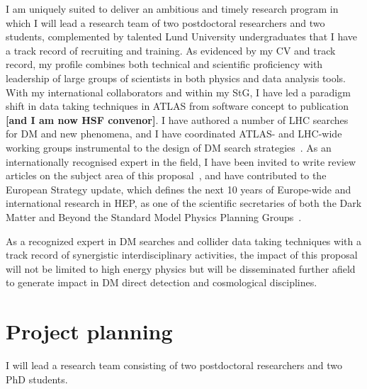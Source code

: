 \documentclass[11pt,a4paper]{article}
\begin{document}
I am uniquely suited to deliver an ambitious and timely research program in which I will lead a research team of two postdoctoral researchers and two students, complemented by talented Lund University undergraduates that I have a track record of recruiting and training.
As evidenced by my CV and track record, my profile combines both technical and scientific proficiency with leadership of large groups of scientists in both physics and data analysis tools. 
With my international collaborators and within my StG, I have led a paradigm shift in data taking techniques in ATLAS from software concept to publication \textbf{[and I am now HSF convenor]}. I have authored a number of LHC searches for DM and new phenomena, and I have coordinated ATLAS- and LHC-wide working groups instrumental to the design of DM search strategies~\cite{DMWG}. 
As an internationally recognised expert in the field, I have been invited to write review articles on the subject area of this proposal~\cite{Buchmueller:2017qhf, Boveia:2018yeb}, and have contributed to the European Strategy update, which defines the next 10 years of Europe-wide and international research in HEP, as one of the scientific secretaries of both the Dark Matter and Beyond the Standard Model Physics Planning Groups~\cite{Strategy:2019vxc}.



As a recognized expert in DM searches and collider data taking techniques with a track record of synergistic interdisciplinary activities, the impact of this proposal will not be limited to high energy physics but will be disseminated further afield to generate impact in DM direct detection and cosmological disciplines.  


\section{Project planning}
\smallskip

I will lead a research team consisting of two postdoctoral researchers and two PhD students. 

\end{document}

